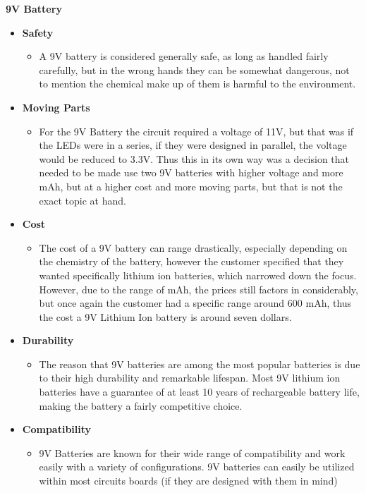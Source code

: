 \documentclass[12pt]{article}
\begin{document}
					\noindent\textbf{9V Battery}
					{\renewcommand\labelitemi{}
						\begin{itemize}
							\item \textbf{Safety}
							\begin{itemize}
								\item A 9V battery is considered generally safe, as long as handled fairly carefully, but in the wrong hands they can be somewhat dangerous, not to mention the chemical make up of them is harmful to the environment.
							\end{itemize}
							\item \textbf{Moving Parts}
							\begin{itemize}
								\item For the 9V Battery the circuit required a voltage of 11V, but that was if the LEDs were in a series, if they were designed in parallel, the voltage would be reduced to 3.3V. Thus this in its own way was a decision that needed to be made use two 9V batteries with higher voltage and more mAh, but at a higher cost and more moving parts, but that is not the exact topic at hand.
							\end{itemize}
							\item \textbf{Cost}
							\begin{itemize}
								\item The cost of a 9V battery can range drastically, especially depending on the chemistry of the battery, however the customer specified that they wanted specifically lithium ion batteries, which narrowed down the focus. However, due to the range of mAh, the prices still factors in considerably, but once again the customer had a specific range around 600 mAh, thus the cost a 9V Lithium Ion battery is around seven dollars.
							\end{itemize}
							\item \textbf{Durability}
							\begin{itemize}
								\item The reason that 9V batteries are among the most popular batteries is due to their high durability and remarkable lifespan. Most 9V lithium ion batteries have a guarantee of at least 10 years of rechargeable battery life, making the battery a fairly competitive choice. 
							\end{itemize}
							\item \textbf{Compatibility}
							\begin{itemize}
								\item 9V Batteries are known for their wide range of compatibility and work easily with a variety of configurations. 9V batteries can easily be utilized within most circuits boards (if they are designed with them in mind)

\end{itemize}
\end{itemize}}
\end{document}
